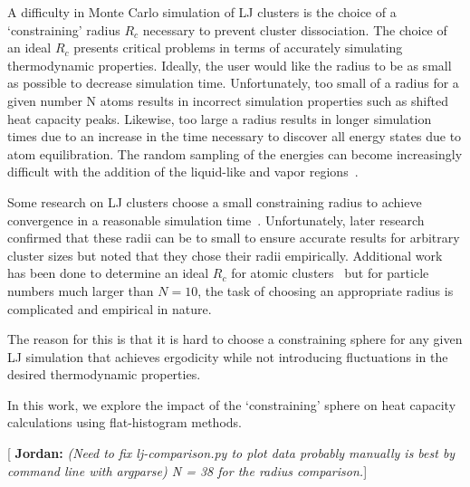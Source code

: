 \documentclass[letterpaper,twocolumn,amsmath,amssymb,pre,aps,10pt]{revtex4-1}
\newcommand{\blue}[1]{{\bf \color{blue} #1}}
\newcommand{\jpsays}[1]{{\color{red} [\blue{Jordan:} \emph{#1}]}}
\begin{document}
A difficulty in Monte Carlo simulation of LJ clusters is the choice of a `constraining' radius $R_c$ necessary to prevent cluster dissociation.
The choice of an ideal $R_c$ presents critical problems in terms of accurately simulating thermodynamic
properties. Ideally, the user would like the radius to be as small as possible to decrease simulation time.
Unfortunately, too small of a radius for a given number N atoms results in incorrect simulation properties
such as shifted heat capacity peaks. Likewise, too large a radius results in longer simulation times
due to an increase in the time necessary to discover all energy states due to atom equilibration. The random
sampling of the energies can become increasingly difficult with the addition of the liquid-like and vapor regions~\cite{neirotti2000phase}.

Some research on LJ clusters choose a small constraining radius to achieve convergence in
a reasonable simulation time~\cite{neirotti2000phase}. Unfortunately, later research~\cite{frantz2001magic} confirmed that these radii can be to small
to ensure accurate results for arbitrary cluster sizes but noted that they chose their radii empirically. Additional work has been done to determine
an ideal $R_c$ for atomic clusters~\cite{yin2012massively} but for particle numbers much larger than $N=10$, the task of choosing an appropriate radius is complicated and empirical
in nature. 

The reason for this is that
it is hard to choose a constraining sphere for any given LJ simulation that achieves ergodicity while not
introducing fluctuations in the desired thermodynamic properties.

In this work, we explore the impact of the `constraining' sphere on heat capacity calculations using flat-histogram
methods.

\jpsays{(Need to fix lj-comparison.py to plot data probably manually is best by command line with argparse)
N = 38 for the radius comparison.}





\end{document}
